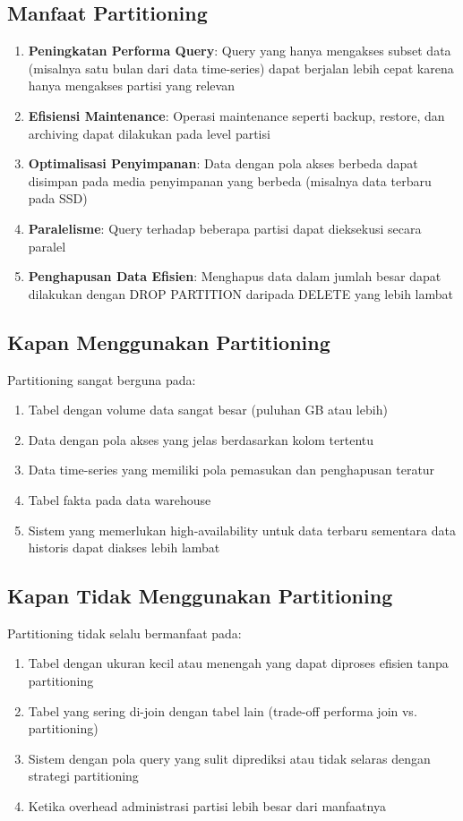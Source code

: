 \subsection{Manfaat Partitioning}
\begin{enumerate}
    \item \textbf{Peningkatan Performa Query}: Query yang hanya mengakses subset data (misalnya satu bulan dari data time-series) dapat berjalan lebih cepat karena hanya mengakses partisi yang relevan
    \item \textbf{Efisiensi Maintenance}: Operasi maintenance seperti backup, restore, dan archiving dapat dilakukan pada level partisi
    \item \textbf{Optimalisasi Penyimpanan}: Data dengan pola akses berbeda dapat disimpan pada media penyimpanan yang berbeda (misalnya data terbaru pada SSD)
    \item \textbf{Paralelisme}: Query terhadap beberapa partisi dapat dieksekusi secara paralel
    \item \textbf{Penghapusan Data Efisien}: Menghapus data dalam jumlah besar dapat dilakukan dengan DROP PARTITION daripada DELETE yang lebih lambat
\end{enumerate}

\subsection{Kapan Menggunakan Partitioning}
Partitioning sangat berguna pada:
\begin{enumerate}
    \item Tabel dengan volume data sangat besar (puluhan GB atau lebih)
    \item Data dengan pola akses yang jelas berdasarkan kolom tertentu
    \item Data time-series yang memiliki pola pemasukan dan penghapusan teratur
    \item Tabel fakta pada data warehouse
    \item Sistem yang memerlukan high-availability untuk data terbaru sementara data historis dapat diakses lebih lambat
\end{enumerate}

\subsection{Kapan Tidak Menggunakan Partitioning}
Partitioning tidak selalu bermanfaat pada:
\begin{enumerate}
    \item Tabel dengan ukuran kecil atau menengah yang dapat diproses efisien tanpa partitioning
    \item Tabel yang sering di-join dengan tabel lain (trade-off performa join vs. partitioning)
    \item Sistem dengan pola query yang sulit diprediksi atau tidak selaras dengan strategi partitioning
    \item Ketika overhead administrasi partisi lebih besar dari manfaatnya
\end{enumerate}

